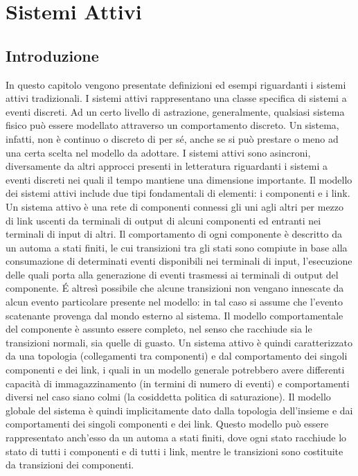 \chapter{Sistemi Attivi}
\section{Introduzione}
In questo capitolo vengono presentate definizioni ed esempi riguardanti i sistemi attivi tradizionali.
I sistemi attivi rappresentano una classe specifica di sistemi a eventi discreti. Ad un certo livello di astrazione, generalmente, qualsiasi sistema fisico può essere modellato attraverso un comportamento discreto. Un sistema, infatti, non è continuo o discreto di per sé, anche se si può prestare o meno ad una certa scelta nel modello da adottare. I sistemi attivi sono asincroni, diversamente da altri approcci presenti in letteratura riguardanti i sistemi a eventi discreti nei quali il tempo mantiene una dimensione importante.
Il modello dei sistemi attivi include due tipi fondamentali di elementi: i componenti e i link. Un sistema attivo è una rete di componenti connessi gli uni agli altri per mezzo di link uscenti da terminali di output di alcuni componenti ed entranti nei terminali di input di altri. Il comportamento di ogni componente è descritto da un automa a stati finiti, le cui transizioni tra gli stati sono compiute in base alla consumazione di determinati eventi disponibili nei terminali di input, l'esecuzione delle quali porta alla generazione di eventi trasmessi ai terminali di output del componente. \'E altresì possibile che alcune transizioni non vengano innescate da alcun evento particolare presente nel modello: in tal caso si assume che l'evento scatenante provenga dal mondo esterno al sistema. Il modello comportamentale del componente è assunto essere completo, nel senso che racchiude sia le transizioni normali, sia quelle di guasto.
Un sistema attivo è quindi caratterizzato da una topologia (collegamenti tra componenti) e dal comportamento dei singoli componenti e dei link, i quali in un modello generale potrebbero avere differenti capacità di immagazzinamento (in termini di numero di eventi) e comportamenti diversi nel caso siano colmi (la cosiddetta politica di saturazione).
Il modello globale del sistema è quindi implicitamente dato dalla topologia dell'insieme e dai comportamenti dei singoli componenti e dei link. Questo modello può essere rappresentato anch'esso da un automa a stati finiti, dove ogni stato racchiude lo stato di tutti i componenti e di tutti i link, mentre le transizioni sono costituite da transizioni dei componenti.

